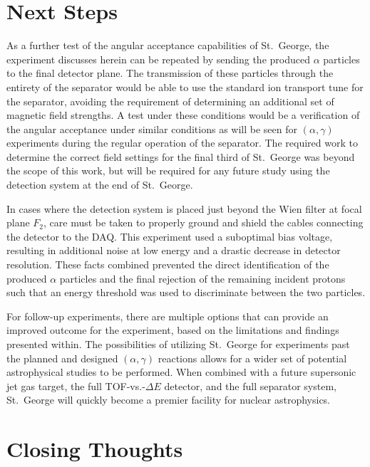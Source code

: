 \section{Next Steps}
\label{sec:next-steps}

As a further test of the angular acceptance capabilities of St.\ George,
the experiment discusses herein can be repeated by sending the produced
$\alpha$ particles to the final detector plane. The transmission of
these particles through the entirety of the separator would be able to
use the standard ion transport tune for the separator, avoiding the
requirement of determining an additional set of magnetic field
strengths. A test under these conditions would be a verification of the
angular acceptance under similar conditions as will be seen for
$(\alpha,\gamma)$ experiments during the regular operation of the
separator. The required work to determine the correct field settings for
the final third of St.\ George was beyond the scope of this work, but
will be required for any future study using the detection system at the
end of St.\ George.

In cases where the detection system is placed just beyond the Wien
filter at focal plane $F_2$, care must be taken to properly ground and
shield the cables connecting the detector to the DAQ. This experiment
used a suboptimal bias voltage, resulting in additional noise at low
energy and a drastic decrease in detector resolution. These facts
combined prevented the direct identification of the produced $\alpha$
particles and the final rejection of the remaining incident protons such
that an energy threshold was used to discriminate between the two
particles.

For follow-up experiments, there are multiple options that can provide
an improved outcome for the experiment, based on the limitations and
findings presented within. The possibilities of utilizing St.\ George
for experiments past the planned and designed $(\alpha,\gamma)$
reactions allows for a wider set of potential astrophysical studies to
be performed. When combined with a future supersonic jet gas target, the
full TOF-vs.-$\Delta E$ detector, and the full separator system, St.\
George will quickly become a premier facility for nuclear astrophysics.


\section{Closing Thoughts}
\label{sec:closing-thoughts}

